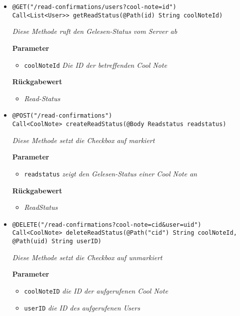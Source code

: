     \begin{itemize}
		\item\texttt{{@GET("/read-confirmations/users?cool-note={id}") \\ Call<List<User>> getReadStatus(@Path(\grqq id\grqq) String coolNoteId)}}

		\textit{Diese Methode ruft den Gelesen-Status vom Server ab}

		\textbf{Parameter} 
			\begin{itemize}
				\item\texttt{coolNoteId}
		 		\textit{Die ID der betreffenden Cool Note}
	 		\end{itemize}

		\textbf{Rückgabewert} 
		\begin{itemize}
		\item\textit{Read-Status}
		\end{itemize}

	\item\texttt{{@POST("/read-confirmations") \\ Call<CoolNote> createReadStatus(@Body Readstatus readstatus) }}

		\textit{Diese Methode setzt die Checkbox auf markiert}

		\textbf{Parameter} 
			\begin{itemize}
				\item\texttt{readstatus}
		 		\textit{zeigt den Gelesen-Status einer Cool Note an}
	 		\end{itemize}

		\textbf{Rückgabewert} 
		\begin{itemize}
		\item\textit{ReadStatus}
		\end{itemize}



	\item\texttt{{@DELETE("/read-confirmations?cool-note={cid}\&user={uid}")
\\Call<CoolNote> deleteReadStatus(@Path("cid") String coolNoteId,
			     @Path(\grqq uid\grqq) String userID)}}

		\textit{Diese Methode setzt die Checkbox auf unmarkiert}

		\textbf{Parameter} 
			\begin{itemize}
				\item\texttt{coolNoteID}
		 		\textit{die ID der aufgerufenen Cool Note}
		 		\item\texttt{userID}
		 		\textit{die ID des aufgerufenen Users}
	 		\end{itemize}
	
	 \end{itemize}


